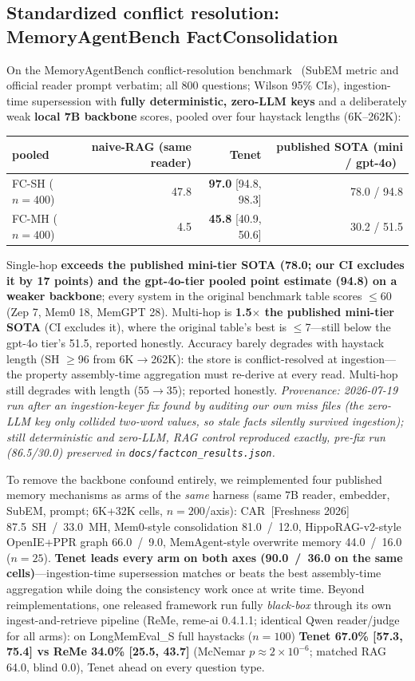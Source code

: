\documentclass[11pt]{article}
\begin{document}
\subsection{Standardized conflict resolution: MemoryAgentBench FactConsolidation}
On the MemoryAgentBench conflict-resolution benchmark~\cite{mab} (SubEM metric and official reader
prompt verbatim; all 800 questions; Wilson 95\% CIs), ingestion-time supersession with
\textbf{fully deterministic, zero-LLM keys} and a deliberately weak \textbf{local 7B
backbone} scores, pooled over four haystack lengths (6K--262K):
\begin{center}\small
\begin{tabular}{lrrr}
\toprule
pooled & naive-RAG (same reader) & \textbf{Tenet} & published SOTA (mini / gpt-4o)~\cite{freshness} \\
\midrule
FC-SH ($n{=}400$) & 47.8 & \textbf{97.0} [94.8, 98.3] & 78.0 / 94.8 \\
FC-MH ($n{=}400$) & 4.5  & \textbf{45.8} [40.9, 50.6] & 30.2 / 51.5 \\
\bottomrule
\end{tabular}
\end{center}
Single-hop \textbf{exceeds the published mini-tier SOTA (78.0; our CI excludes it by 17
points) and the gpt-4o-tier pooled point estimate (94.8) on a weaker backbone}; every
system in the original benchmark table scores $\le$60 (Zep 7, Mem0 18, MemGPT 28).
Multi-hop is \textbf{1.5$\times$ the published mini-tier SOTA} (CI excludes it), where the
original table's best is $\le$7---still below the gpt-4o tier's 51.5, reported honestly.
Accuracy barely degrades with haystack length (SH $\ge$96 from 6K$\to$262K): the store is
conflict-resolved at ingestion---the property assembly-time aggregation must re-derive at
every read. Multi-hop still degrades with length ($55\!\to\!35$); reported honestly.
\emph{Provenance: 2026-07-19 run after an ingestion-keyer fix found by auditing our own
miss files (the zero-LLM key only collided two-word values, so stale facts silently
survived ingestion); still deterministic and zero-LLM, RAG control reproduced exactly,
pre-fix run (86.5/30.0) preserved in \texttt{docs/factcon\_results.json}.}

To remove the backbone confound entirely, we reimplemented four published memory
mechanisms as arms of the \emph{same} harness (same 7B reader, embedder, SubEM, prompt;
6K+32K cells, $n{=}200$/axis): CAR~[Freshness 2026] 87.5~SH~/~33.0~MH, Mem0-style
consolidation 81.0~/~12.0, HippoRAG-v2-style OpenIE+PPR graph 66.0~/~9.0, MemAgent-style
overwrite memory 44.0~/~16.0 ($n{=}25$). \textbf{Tenet leads every arm on both axes
(90.0~/~36.0 on the same cells)}---ingestion-time supersession matches or beats the best
assembly-time aggregation while doing the consistency work once at write time.
Beyond reimplementations, one released framework run fully \emph{black-box} through its
own ingest-and-retrieve pipeline (ReMe, reme-ai 0.4.1.1; identical Qwen reader/judge for
all arms): on LongMemEval\_S full haystacks ($n{=}100$) \textbf{Tenet 67.0\%
[57.3, 75.4] vs ReMe 34.0\% [25.5, 43.7]} (McNemar $p\approx2\times10^{-6}$; matched
RAG 64.0, blind 0.0), Tenet ahead on every question type.
\end{document}
